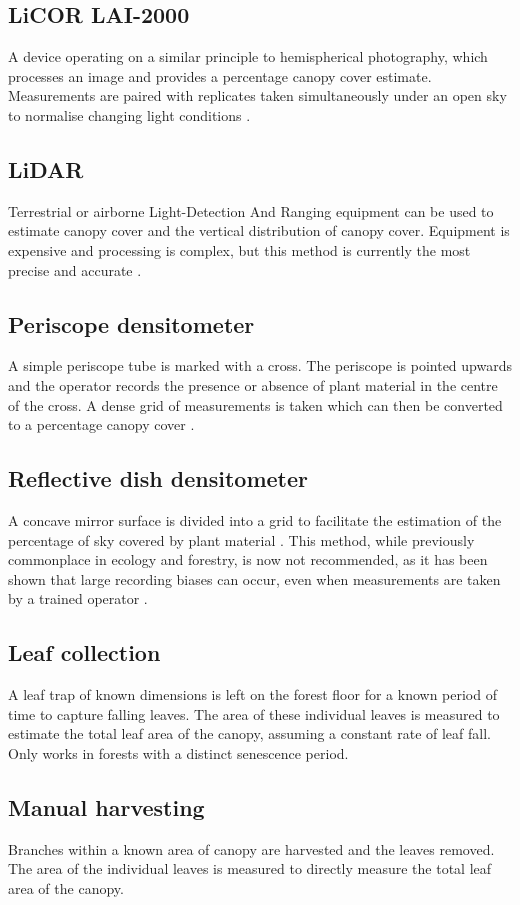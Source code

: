 \documentclass{article}
\begin{document}
\subsection{LiCOR LAI-2000}

A device operating on a similar principle to hemispherical photography, which processes an image and provides a percentage canopy cover estimate. Measurements are paired with replicates taken simultaneously under an open sky to normalise changing light conditions \citep{Gower1991}.

\subsection{LiDAR}

Terrestrial or airborne Light-Detection And Ranging equipment can be used to estimate canopy cover and the vertical distribution of canopy cover. Equipment is expensive and processing is complex, but this method is currently the most precise and accurate \citep{Seidel2011}.

\subsection{Periscope densitometer}

A simple periscope tube is marked with a cross. The periscope is pointed upwards and the operator records the presence or absence of plant material in the centre of the cross. A dense grid of measurements is taken which can then be converted to a percentage canopy cover \citep{GRS}.

\subsection{Reflective dish densitometer}

A concave mirror surface is divided into a grid to facilitate the estimation of the percentage of sky covered by plant material \citep{Lemmon1956}. This method, while previously commonplace in ecology and forestry, is now not recommended, as it has been shown that large recording biases can occur, even when measurements are taken by a trained operator \citep{Korhonen2006}.

\subsection{Leaf collection}

A leaf trap of known dimensions is left on the forest floor for a known period of time to capture falling leaves. The area of these individual leaves is measured to estimate the total leaf area of the canopy, assuming a constant rate of leaf fall. Only works in forests with a distinct senescence period.

\subsection{Manual harvesting}

Branches within a known area of canopy are harvested and the leaves removed. The area of the individual leaves is measured to directly measure the total leaf area of the canopy.

\printbibliography
\end{document}
